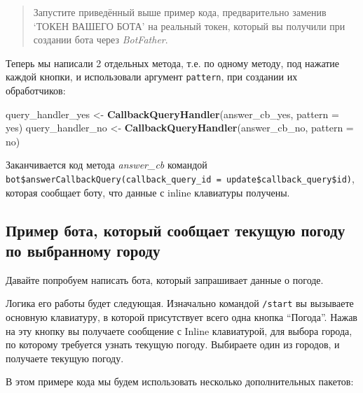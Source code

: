 \documentclass[
]{book}
\newenvironment{Shaded}{\begin{snugshade}}{\end{snugshade}}
\newcommand{\AttributeTok}[1]{\textcolor[rgb]{0.13,0.29,0.53}{#1}}
\newcommand{\FunctionTok}[1]{\textcolor[rgb]{0.13,0.29,0.53}{\textbf{#1}}}
\newcommand{\NormalTok}[1]{#1}
\newcommand{\OtherTok}[1]{\textcolor[rgb]{0.56,0.35,0.01}{#1}}
\newcommand{\StringTok}[1]{\textcolor[rgb]{0.31,0.60,0.02}{#1}}
\begin{document}
\begin{quote}
Запустите приведённый выше пример кода, предварительно заменив `ТОКЕН ВАШЕГО БОТА' на реальный токен, который вы получили при создании бота через \emph{BotFather}.
\end{quote}

Теперь мы написали 2 отдельных метода, т.е. по одному методу, под нажатие каждой кнопки, и использовали аргумент \texttt{pattern}, при создании их обработчиков:

\begin{Shaded}
\begin{Highlighting}[]
\NormalTok{query\_handler\_yes }\OtherTok{\textless{}{-}} \FunctionTok{CallbackQueryHandler}\NormalTok{(answer\_cb\_yes, }\AttributeTok{pattern =} \StringTok{\textquotesingle{}yes\textquotesingle{}}\NormalTok{)}
\NormalTok{query\_handler\_no  }\OtherTok{\textless{}{-}} \FunctionTok{CallbackQueryHandler}\NormalTok{(answer\_cb\_no, }\AttributeTok{pattern =} \StringTok{\textquotesingle{}no\textquotesingle{}}\NormalTok{)}
\end{Highlighting}
\end{Shaded}

Заканчивается код метода \emph{answer\_cb} командой \texttt{bot\$answerCallbackQuery(callback\_query\_id\ =\ update\$callback\_query\$id)}, которая сообщает боту, что данные с inline клавиатуры получены.

\subsection{Пример бота, который сообщает текущую погоду по выбранному городу}\label{ux43fux440ux438ux43cux435ux440-ux431ux43eux442ux430-ux43aux43eux442ux43eux440ux44bux439-ux441ux43eux43eux431ux449ux430ux435ux442-ux442ux435ux43aux443ux449ux443ux44e-ux43fux43eux433ux43eux434ux443-ux43fux43e-ux432ux44bux431ux440ux430ux43dux43dux43eux43cux443-ux433ux43eux440ux43eux434ux443}

Давайте попробуем написать бота, который запрашивает данные о погоде.

Логика его работы будет следующая. Изначально командой \texttt{/start} вы вызываете основную клавиатуру, в которой присутствует всего одна кнопка ``Погода''. Нажав на эту кнопку вы получаете сообщение с Inline клавиатурой, для выбора города, по которому требуется узнать текущую погоду. Выбираете один из городов, и получаете текущую погоду.

В этом примере кода мы будем использовать несколько дополнительных пакетов:
\end{document}
